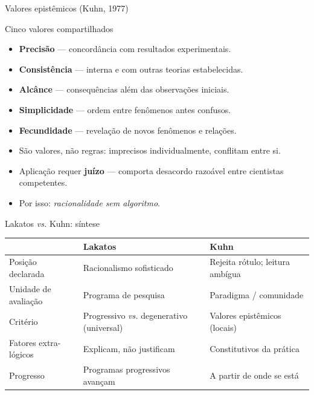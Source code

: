 \documentclass[aspectratio=169]{beamer}
\newcommand{\impt}[1]{\textcolor{maccent}{\textbf{#1}}}
\newcommand{\ntc}[1]{\textcolor{mprimary}{#1}}
\begin{document}
\begin{frame}{Valores epist\^emicos (Kuhn, 1977)}
\begin{block}{Cinco valores compartilhados}
\begin{itemize}
    \item \impt{Precis\~ao} --- concord\^ancia com resultados experimentais.
    \item \impt{Consist\^encia} --- interna e com outras teorias estabelecidas.
    \item \impt{Alc\^ance} --- consequ\^encias al\'em das observa\c c\~oes iniciais.
    \item \impt{Simplicidade} --- ordem entre fen\^omenos antes confusos.
    \item \impt{Fecundidade} --- revela\c c\~ao de novos fen\^omenos e rela\c c\~oes.
\end{itemize}
\end{block}
\vspace{0.3cm}
\begin{itemize}
    \item S\~ao \ntc{valores}, n\~ao regras: imprecisos individualmente, conflitam entre si.
    \item Aplica\c c\~ao requer \impt{ju\'izo} --- comporta desacordo razo\'avel entre cientistas competentes.
    \item Por isso: \emph{racionalidade sem algoritmo}.
\end{itemize}
\end{frame}

\begin{frame}{Lakatos \emph{vs.} Kuhn: s\'intese}
\begin{center}
\footnotesize
\begin{tabularx}{\linewidth}{@{} l X X @{}}
\toprule
 & \textcolor{mprimary}{\textbf{Lakatos}} & \textcolor{maccent}{\textbf{Kuhn}} \\
\midrule
Posi\c c\~ao declarada & Racionalismo sofisticado & Rejeita r\'otulo; leitura amb\'igua \\[0.15cm]
Unidade de avalia\c c\~ao & Programa de pesquisa & Paradigma / comunidade \\[0.15cm]
Crit\'erio & Progressivo \emph{vs.} degenerativo (universal) & Valores epist\^emicos (locais) \\[0.15cm]
Fatores extra-l\'ogicos & Explicam, n\~ao justificam & Constitutivos da pr\'atica \\[0.15cm]
Progresso & Programas progressivos avan\c cam & A partir de onde se est\'a \\
\bottomrule
\end{tabularx}
\end{center}
\end{frame}
\end{document}
